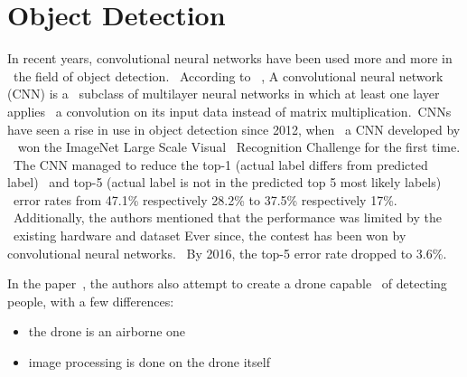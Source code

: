 \section{Object Detection}
\label{sec:research-object-detection}
In recent years, convolutional neural networks have been used more and more in \
the field of object detection. \
According to ~\cite{deepLearning}, A convolutional neural network (CNN) is a \
subclass of multilayer neural networks in which at least one layer applies \
a convolution on its input data instead of matrix multiplication.\
CNNs have seen a rise in use in object detection since 2012, when \
a CNN developed by ~\cite{imagenet} won the ImageNet Large Scale Visual \
Recognition Challenge for the first time. \
The CNN managed to reduce the top-1 (actual label differs from predicted label) \
 and top-5 (actual label is not in the predicted top 5 most likely labels) \
error rates from 47.1\% respectively 28.2\% to 37.5\% respectively 17\%. \
Additionally, the authors mentioned that the performance was limited by the \
existing hardware and dataset
Ever since, the contest has been won by convolutional neural networks. \
By 2016, the top-5 error rate dropped to 3.6\%.

In the paper~\cite{deepDrone}, the authors also attempt to create a drone capable \
of detecting people, with a few differences:
\begin{itemize}
    \item the drone is an airborne one
    \item image processing is done on the drone itself
\end{itemize}









